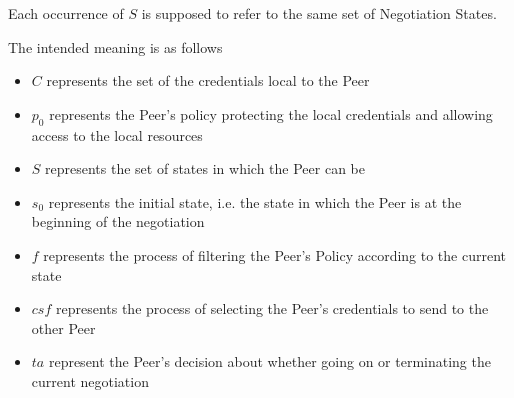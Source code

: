 \documentclass{article}
\begin{document}
Each occurrence of $S$ is supposed to refer to the same set of Negotiation States.

The intended meaning is as follows
\begin{itemize}
	\item $C$ represents the set of the credentials local to the Peer
	\item $p_{0}$ represents the Peer's policy protecting the local credentials and allowing access to the local resources
	\item $S$ represents the set of states in which the Peer can be
	\item $s_{0}$ represents the initial state, i.e. the state in which the Peer is at the beginning of the negotiation
	\item $f$ represents the process of filtering the Peer's Policy according to the current state
	\item $csf$ represents the process of selecting the Peer's credentials to send to the other Peer
	\item $ta$ represent the Peer's decision about whether going on or terminating the current negotiation
\end{itemize}
\end{document}
